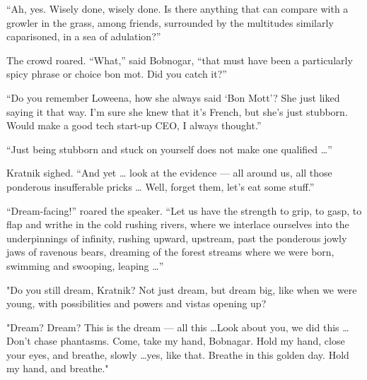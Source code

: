 ``Ah, yes. Wisely done, wisely done. Is there anything that can compare
with a growler in the grass, among friends, surrounded by the multitudes
similarly caparisoned, in a sea of adulation?''

The crowd roared. ``What,'' said Bobnogar, ``that must have been a
particularly spicy phrase or choice bon mot. Did you catch it?''

``Do you remember Loweena, how she always said `Bon Mott'? She just
liked saying it that way. I'm sure she knew that it's French, but she's
just stubborn. Would make a good tech start-up CEO, I always thought.''

``Just being stubborn and stuck on yourself does not make one
qualified \ldots{}''

Kratnik sighed. ``And yet \ldots{} look at the evidence --- all around us,
all those ponderous insufferable pricks \ldots{} Well, forget them,
let's eat some stuff.''

``Dream-facing!'' roared the speaker. ``Let us have the strength to
grip, to gasp, to flap and writhe in the cold rushing rivers, where we
interlace ourselves into the underpinnings of infinity, rushing upward,
upstream, past the ponderous jowly jaws of ravenous bears, dreaming of
the forest streams where we were born, swimming and swooping,
leaping \ldots{}''

"Do you still dream, Kratnik? Not just dream, but dream big, like when
we were young, with possibilities and powers and vistas opening up?

"Dream? Dream? This is the dream --- all this \ldots Look about you, we did
this \ldots Don't chase phantasms. Come, take my hand, Bobnagar. Hold my
hand, close your eyes, and breathe, slowly \ldots yes, like that. Breathe in
this golden day. Hold my hand, and breathe."
